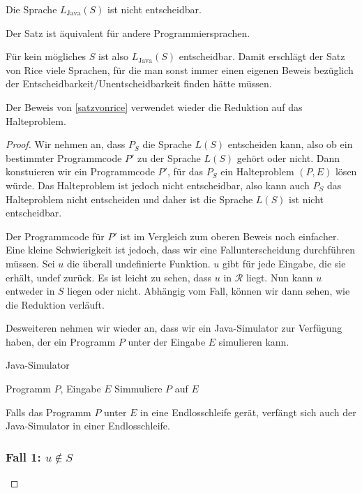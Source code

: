 \documentclass[journal]{IEEEtran}
\begin{document}
\begin{theorem}
\label{satzvonrice}
  Die Sprache $L_\text{Java}(S)$ ist nicht entscheidbar.
\end{theorem}

Der Satz ist äquivalent für andere Programmiersprachen.

Für kein mögliches $S$ ist also $L_\text{Java}(S)$ entscheidbar. Damit erschlägt der Satz von Rice viele Sprachen, für die man sonst immer einen eigenen Beweis bezüglich der Entscheidbarkeit/Unentscheidbarkeit finden hätte müssen.

Der Beweis von \ref{satzvonrice} verwendet wieder die Reduktion auf das Halteproblem.

\begin{proof}

Wir nehmen an, dass $P_S$ die Sprache $L(S)$ entscheiden kann, also ob ein bestimmter Programmcode $P'$ zu der Sprache $L(S)$ gehört oder nicht. Dann konstuieren wir ein Programmcode $P'$, für das $P_S$ ein Halteproblem $(P, E)$ lösen würde. Das Halteproblem ist jedoch nicht entscheidbar, also kann auch $P_S$ das Halteproblem nicht entscheiden und daher ist die Sprache $L(S)$ ist nicht entscheidbar.

Der Programmcode für $P'$ ist im Vergleich zum oberen Beweis noch einfacher. Eine kleine Schwierigkeit ist jedoch, dass wir eine Fallunterscheidung durchführen müssen. Sei $u$ die überall undefinierte Funktion. $u$ gibt für jede Eingabe, die sie erhält, $\mathrm{undef}$ zurück. Es ist leicht zu sehen, dass $u$ in $\mathcal{R}$ liegt. Nun kann $u$ entweder in $S$ liegen oder nicht. Abhängig vom Fall, können wir dann sehen, wie die Reduktion verläuft.

Desweiteren nehmen wir wieder an, dass wir ein Java-Simulator zur Verfügung haben, der ein Programm $P$ unter der Eingabe $E$ simulieren kann.

\begin{algorithm}
\caption{Java-Simulator}
\begin{algorithmic}[1]
\renewcommand{\algorithmicrequire}{\textbf{Input:}}
\renewcommand{\algorithmicensure}{\textbf{Output:}}
\REQUIRE Programm $P$, Eingabe $E$
\STATE Simmuliere $P$ auf $E$
\end{algorithmic}
\end{algorithm}

Falls das Programm $P$ unter $E$ in eine Endlosschleife gerät, verfängt sich auch der Java-Simulator in einer Endlosschleife.

\subsubsection{Fall 1: $u \notin S$}


\end{proof}
\end{document}
